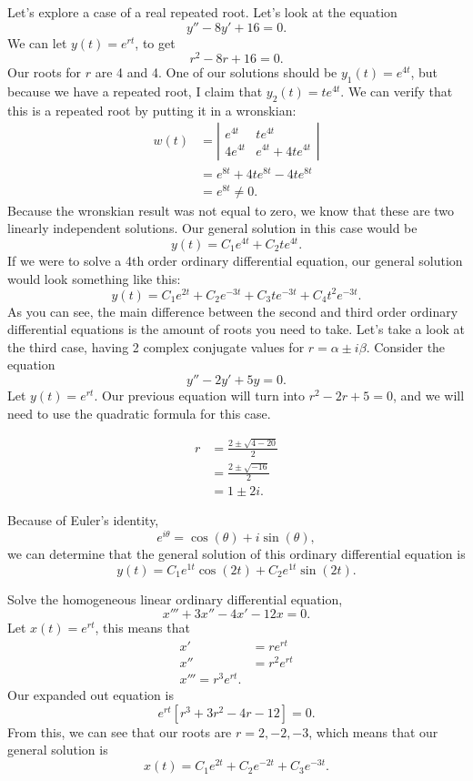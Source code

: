   Let's explore a case of a real repeated root. Let's look at the equation
  \[
  y''-8y'+16=0 
  .\] 
  We can let $y(t)=e^{rt}$, to get
  \[
  r^2-8r+16=0
  .\] 
  Our roots for $r$ are 4 and 4. One of our solutions should be $y_1(t)=e^{4t}$, but because we have a repeated root, I claim that $y_2(t)=te^{4t}$. We can verify that this is a repeated root by putting it in a wronskian:
    \begin{align*}
      w(t)&=\left| 
      \begin{matrix}
        e^{4t}&te^{4t}\\
        4e^{4t}&e^{4t}+4te^{4t}
      \end{matrix}
      \right|\\
          &=e^{8t}+4te^{8t}-4te^{8t}\\
          &=e^{8t}\neq 0
    .\end{align*}
    Because the wronskian result was not equal to zero, we know that these are two linearly independent solutions. Our general solution in this case would be
    \[
      y(t)=C_1e^{4t}+C_2te^{4t}
    .\] 
    If we were to solve a 4th order ordinary differential equation, our general solution would look something like this:
    \[
      y(t)=C_1e^{2t}+C_2e^{-3t}+C_3te^{-3t}+C_4t^2e^{-3t}
    .\] 
    As you can see, the main difference between the second and third order ordinary differential equations is the amount of roots you need to take. Let's take a look at the third case, having 2 complex conjugate values for $r=\alpha\pm i\beta$.\newline\newline
    Consider the equation
    \[
    y''-2y'+5y=0
    .\] 
    Let $y(t)=e^{rt}$. Our previous equation will turn into $r^2-2r+5=0$, and we will need to use the quadratic formula for this case.

    \begin{align*}
      r&=\frac{2\pm\sqrt{4-20} }{2}\\
       &=\frac{2\pm\sqrt{-16} }{2}\\
       &=1\pm 2i
    .\end{align*}

    Because of Euler's identity,
    \[
      e^{i\theta}=\cos(\theta)+i\sin(\theta)
    ,\]
    we can determine that the general solution of this ordinary differential equation is
    \[
    y(t)=C_1e^{1t}\cos(2t)+C_2e^{1t}\sin(2t)
    .\] 
    \begin{problem}
      Solve the homogeneous linear ordinary differential equation,
      \[
      x'''+3x''-4x'-12x=0
      .\] 
      Let $x(t)=e^{rt}$, this means that 
      \begin{align*}
        x'&=re^{rt}\\
        x''&=r^2e^{rt}\\
        x'''=r^3e^{rt}
      .\end{align*}
    Our expanded out equation is 
    \[
      e^{rt}[r^3+3r^2-4r-12]=0
    .\] 
    From this, we can see that our roots are $r=2,-2,-3$, which means that our general solution is
    \[
      x(t)=C_1e^{2t}+C_2e^{-2t}+C_3e^{-3t}
    .\] 
    \end{problem}

